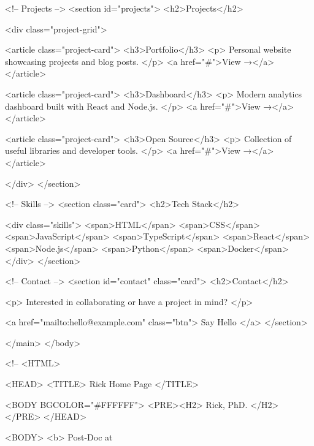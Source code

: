         <!-- Projects -->
        <section id="projects">
            <h2>Projects</h2>

            <div class="project-grid">

                <article class="project-card">
                    <h3>Portfolio</h3>
                    <p>
                        Personal website showcasing projects and blog posts.
                    </p>
                    <a href="#">View →</a>
                </article>

                <article class="project-card">
                    <h3>Dashboard</h3>
                    <p>
                        Modern analytics dashboard built with React and Node.js.
                    </p>
                    <a href="#">View →</a>
                </article>

                <article class="project-card">
                    <h3>Open Source</h3>
                    <p>
                        Collection of useful libraries and developer tools.
                    </p>
                    <a href="#">View →</a>
                </article>

            </div>
        </section>

        <!-- Skills -->
        <section class="card">
            <h2>Tech Stack</h2>

            <div class="skills">
                <span>HTML</span>
                <span>CSS</span>
                <span>JavaScript</span>
                <span>TypeScript</span>
                <span>React</span>
                <span>Node.js</span>
                <span>Python</span>
                <span>Docker</span>
            </div>
        </section>

        <!-- Contact -->
        <section id="contact" class="card">
            <h2>Contact</h2>

            <p>
                Interested in collaborating or have a project in mind?
            </p>

            <a href="mailto:hello@example.com" class="btn">
                Say Hello
            </a>
        </section>

    </main>
</body>


<!-- <HTML>

<HEAD>
    <TITLE> Rick Home Page </TITLE>

<BODY BGCOLOR="#FFFFFF">
    <PRE><H2>    Rick, PhD.
    </H2></PRE>
    </HEAD>

    <BODY>
        <b> Post-Doc at

